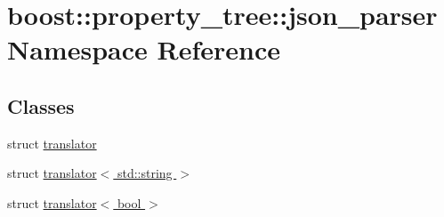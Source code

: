 \hypertarget{namespaceboost_1_1property__tree_1_1json__parser}{\section{boost\-:\-:property\-\_\-tree\-:\-:json\-\_\-parser Namespace Reference}
\label{namespaceboost_1_1property__tree_1_1json__parser}
}
\subsection*{Classes}
\begin{DoxyCompactItemize}
\item 
struct \hyperlink{structboost_1_1property__tree_1_1json__parser_1_1translator}{translator}
\item 
struct \hyperlink{structboost_1_1property__tree_1_1json__parser_1_1translator_3_01std_1_1string_01_4}{translator$<$ std\-::string $>$}
\item 
struct \hyperlink{structboost_1_1property__tree_1_1json__parser_1_1translator_3_01bool_01_4}{translator$<$ bool $>$}
\end{DoxyCompactItemize}
